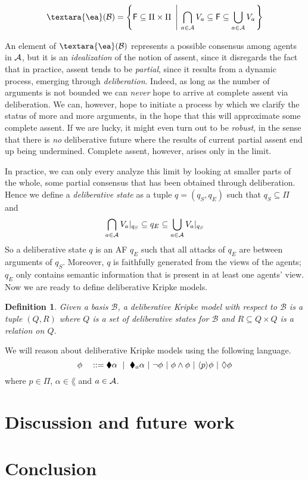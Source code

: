\documentclass{article}
\newtheorem{definition}[thm]{Definition}
\newcommand{\cons}[1]{{\textara{\ea}}(#1)}
\newcommand{\af}{{\sf F}}
\newcommand{\views}{\mathcal B}
\begin{document}
\begin{equation}\label{def:consensus}
\cons \views = \left\{\af \subseteq \Pi \times \Pi ~\left|~ \bigcap_{a \in \agents}V_a \subseteq \af \subseteq \bigcup_{a \in \agents}V_a\right.\right\}
\end{equation}

An element of $\cons \views$ represents a possible consensus among agents in $\mathcal A$, but it is an \emph{idealization} of the notion of assent, since it disregards the fact that in practice, assent tends to be \emph{partial}, since it results from a dynamic process, emerging through \emph{deliberation}. Indeed, as long as the number of arguments is not bounded we can \emph{never} hope to arrive at complete assent via deliberation. We can, however, hope to initiate a process by which we clarify the status of more and more arguments, in the hope that this will approximate some complete assent. If we are lucky, it might even turn out to be \emph{robust}, in the sense that there is \emph{no} deliberative future where the results of current partial assent end up being undermined. Complete assent, however, arises only in the limit.

In practice, we can only every analyze this limit by looking at smaller parts of the whole, some partial consensus that has been obtained through deliberation. Hence we define a \emph{deliberative state} as a tuple $q = (q_S,q_E)$ such that $q_S \subseteq \Pi$ and 
\begin{equation}\label{eq:ds}
\bigcap_{a \in \mathcal A}{V_a}|_{q_S} \subseteq q_E \subseteq \bigcup_{a\in \mathcal A} {V_a}|_{q_S}
\end{equation}
So a deliberative state $q$ is an AF $q_E$ such that all attacks of $q_E$ are between arguments of $q_S$. Moreover, $q$ is faithfully generated from the views of the agents; $q_E$ only contains semantic information that is present in at least one agents' view. Now we are ready to define deliberative Kripke models.

\begin{definition}\label{main}
Given a basis $\views$, a deliberative Kripke model with respect to $\views$ is a tuple $(Q,R)$ where $Q$ is a set of deliberative states for $\views$ and $R \subseteq Q \times Q$ is a relation on $Q$.
\end{definition}
We will reason about deliberative Kripke models using the following language.
$$ \phi \quad ::= \cdia \alpha \ \mid \ \cdia_a \alpha ~|~ \neg \phi ~|~ \phi \wedge \phi ~|~ \ddia p \phi ~|~ \adia \phi$$ 
where $p \in \Pi$, $\alpha \in \lang$ and $a \in \mathcal A$.

\section{Discussion and future work}\label{sec:fut}

\section{Conclusion}\label{sec:conc}
\end{document}
